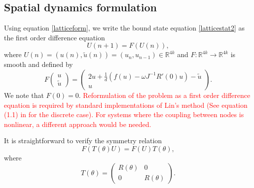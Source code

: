 \documentclass[12pt]{elsarticle}
\def\R{{\mathbb R}}
\newcommand{\revised}[1]{ \textcolor{red}{#1} }
\begin{document}
\subsection{Spatial dynamics formulation}

Using equation \ref{latticeform}, we write the bound state equation \cref{latticestat2} as the first order difference equation
\begin{equation}\label{diffeq}
U(n+1) = F(U(n)),
\end{equation}
where $U(n) = (u(n), \tilde{u}(n)) = (u_n, u_{n-1}) \in \R^{4k}$ and $F: \R^{4k}\rightarrow \R^{4k}$ is smooth and defined by
\begin{equation}\label{latticeF}
F\begin{pmatrix}u \\ \tilde{u} \end{pmatrix} =
\begin{pmatrix}
2 u +\frac{1}{d}\left( f(u) - \omega J^{-1} R'(0) u \right) - \tilde{u} \\
u
\end{pmatrix}.
\end{equation}
We note that $F(0) = 0$. \revised{Reformulation of the problem as a first order difference equation is required by standard implementations of Lin's method (See equation (1.1) in \cite{Knobloch2000} for the discrete case). For systems where the coupling between nodes is nonlinear, a different approach would be needed.}

It is straightforward to verify the symmetry relation 
\begin{equation}
F(T(\theta)U) = F(U)T(\theta),
\end{equation}
where
\begin{equation}
T(\theta) = \begin{pmatrix}
R(\theta) & 0 \\ 0 & R(\theta)
\end{pmatrix}.
\end{equation}
\end{document}
